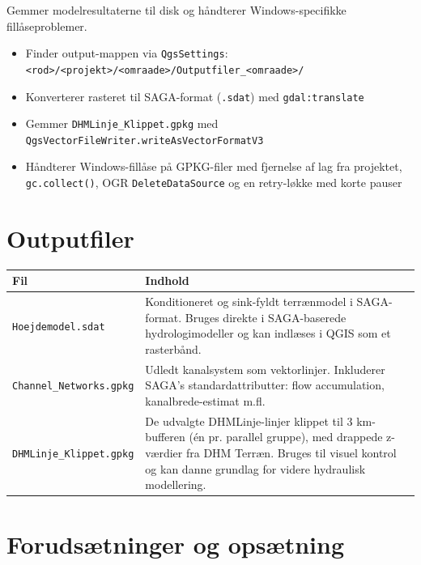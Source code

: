 Gemmer modelresultaterne til disk og håndterer Windows-specifikke fillåseproblemer.

\begin{itemize}
  \item Finder output-mappen via \texttt{QgsSettings}:
        \texttt{<rod>/<projekt>/<omraade>/Outputfiler\_<omraade>/}
  \item Konverterer rasteret til SAGA-format (\texttt{.sdat}) med
        \texttt{gdal:translate}
  \item Gemmer \texttt{DHMLinje\_Klippet.gpkg} med
        \texttt{QgsVectorFileWriter.writeAsVectorFormatV3}
  \item Håndterer Windows-fillåse på GPKG-filer med fjernelse af lag fra
        projektet, \texttt{gc.collect()}, OGR \texttt{DeleteDataSource} og
        en retry-løkke med korte pauser
\end{itemize}


\section{Outputfiler}

\begin{tabular}{lp{9cm}}
  \hline
  \textbf{Fil} & \textbf{Indhold} \\
  \hline
  \texttt{Hoejdemodel.sdat} &
    Konditioneret og sink-fyldt terrænmodel i SAGA-format. Bruges direkte i
    SAGA-baserede hydrologimodeller og kan indlæses i QGIS som et rasterbånd. \\[4pt]
  \texttt{Channel\_Networks.gpkg} &
    Udledt kanalsystem som vektorlinjer. Inkluderer SAGA's standardattributter:
    flow accumulation, kanalbrede-estimat m.fl. \\[4pt]
  \texttt{DHMLinje\_Klippet.gpkg} &
    De udvalgte DHMLinje-linjer klippet til 3 km-bufferen (én pr. parallel
    gruppe), med drappede z-værdier fra DHM Terræn. Bruges til visuel kontrol
    og kan danne grundlag for videre hydraulisk modellering. \\
  \hline
\end{tabular}


\section{Forudsætninger og opsætning}


